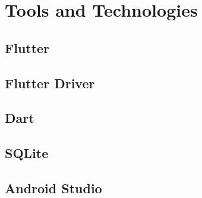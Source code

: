 \chapter{Tools and Technologies}
\section{Flutter}
\section{Flutter Driver}
\section{Dart}
\section{SQLite}
\section{Android Studio}
